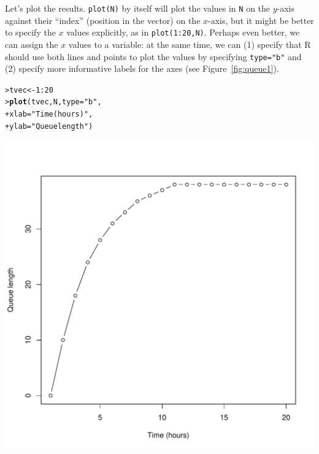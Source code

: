 \documentclass[11pt]{article}\usepackage[]{graphicx}\usepackage[]{color}
\makeatletter
\def\maxwidth{ %
  \ifdim\Gin@nat@width>\linewidth
    \linewidth
  \else
    \Gin@nat@width
  \fi
}
\newcommand{\hlnum}[1]{\textcolor[rgb]{0.686,0.059,0.569}{#1}}%
\newcommand{\hlstr}[1]{\textcolor[rgb]{0.192,0.494,0.8}{#1}}%
\newcommand{\hlopt}[1]{\textcolor[rgb]{0,0,0}{#1}}%
\newcommand{\hlstd}[1]{\textcolor[rgb]{0.345,0.345,0.345}{#1}}%
\newcommand{\hlkwb}[1]{\textcolor[rgb]{0.69,0.353,0.396}{#1}}%
\newcommand{\hlkwc}[1]{\textcolor[rgb]{0.333,0.667,0.333}{#1}}%
\newcommand{\hlkwd}[1]{\textcolor[rgb]{0.737,0.353,0.396}{\textbf{#1}}}%
\newenvironment{kframe}{%
 \def\at@end@of@kframe{}%
 \ifinner\ifhmode%
  \def\at@end@of@kframe{\end{minipage}}%
  \begin{minipage}{\columnwidth}%
 \fi\fi%
 \def\FrameCommand##1{\hskip\@totalleftmargin \hskip-\fboxsep
 \colorbox{shadecolor}{##1}\hskip-\fboxsep
     \hskip-\linewidth \hskip-\@totalleftmargin \hskip\columnwidth}%
 \MakeFramed {\advance\hsize-\width
   \@totalleftmargin\z@ \linewidth\hsize
   \@setminipage}}%
 {\par\unskip\endMakeFramed%
 \at@end@of@kframe}
\newenvironment{knitrout}{}{} %
\newcommand{\code}[1]{{\tt #1}}
\numberwithin{exercise}{section}
\makeatother
\begin{document}
Let's plot the results.  \code{plot(N)} by itself will plot the values
in \code{N} on the $y$-axis against their ``index'' (position in the
vector) on the $x$-axis, but it might be better to specify the $x$
values explicitly, as in \code{plot(1:20,N)}.  Perhaps even better, we
can assign the $x$ values to a variable: at the same time, we can (1)
specify that R should use both lines and points to plot the values by
specifying \code{type="b"} and (2) specify more informative labels for
the axes (see Figure~\ref{fig:queue1}).
\begin{knitrout}
\color{fgcolor}\begin{kframe}
\begin{alltt}
\hlstd{> }\hlstd{tvec} \hlkwb{<-} \hlnum{1}\hlopt{:}\hlnum{20}
\hlstd{> }\hlkwd{plot}\hlstd{(tvec, N,} \hlkwc{type} \hlstd{=} \hlstr{"b"}\hlstd{,}
\hlstd{+  }     \hlkwc{xlab} \hlstd{=} \hlstr{"Time (hours)"}\hlstd{,}
\hlstd{+  }     \hlkwc{ylab} \hlstd{=} \hlstr{"Queue length"}\hlstd{)}
\end{alltt}
\end{kframe}
\includegraphics[width=\maxwidth]{figure/firstPlot} 

\end{knitrout}
\end{document}
